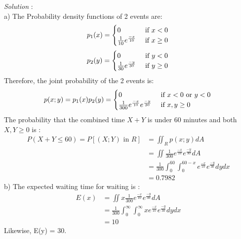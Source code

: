 \documentclass[a4paper]{article}
\begin{document}
	\textit{Solution} : \\
	a) The Probability density functions of 2 events are:
	\begin{equation*}
	p_1(x)=\begin{cases} 0 &\text{ if } x < 0 \\ \frac{1}{10}e^{\frac{-x}{10}}& \text { if }x \geq 0\end{cases}\\
	\end{equation*}
	\begin{equation*}
	p_2(y)=\begin{cases} 0 &\text{ if } y < 0 \\ \frac{1}{30}e^{\frac{-y}{30}}& \text { if }y \geq 0\end{cases}\\
	\end{equation*}
	Therefore, the joint probability of the 2 events is:
	\begin{equation*}
	p(x;y) = p_1(x)p_2(y) =\begin{cases}0 &\text{ if } x < 0 \text{ or } y < 0 \\ \frac{1}{300}e^{\frac{-x}{10}}e^{\frac{-y}{30}}& \text{ if }x,y \geq 0\end{cases}\\
	\end{equation*}
	The probability that the combined time $X+Y$ is under 60 minutes and both $X,Y \geq 0$ is :
	\begin{align*} 
	P (X+Y \leq 60) = P[(X;Y) \text{ in }  R] &=\iint_R p(x;y) dA\\
	&=  \iint\frac{1}{300}e^{\frac{-x}{10}}e^{\frac{-y}{30}} dA\\
	&= \frac{1}{300}\int_{0}^{60}\int_0^{60-x}e^{\frac{-x}{10}}e^{\frac{-y}{30}} dydx\\&=0.7982  
	\end{align*} 
	b) The expected waiting time for waiting is :
	\begin{align*}
	E(x) &= \iint x\frac{1}{300}e^{\frac{-x}{10}}e^{\frac{-y}{30}} dA \\  
	&=\frac{1}{300}\int_0^{\infty}\int_0^{\infty}xe^{\frac{-x}{10}}e^{\frac{-y}{30}}dydx \\
	&= 10 
	\end{align*}
	Likewise, E(y) = 30.
	\newpage
\end{document}
